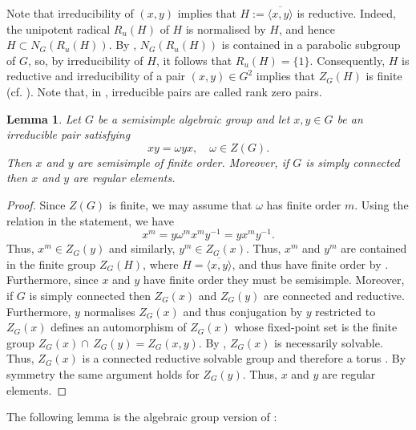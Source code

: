 \documentclass[12pt, a4paper, oneside]{amsart}
\theoremstyle{plain} %
\newtheorem{lemma}[theorem]{Lemma}
\theoremstyle{definition} %
\theoremstyle{remark} %
\begin{document}
Note that irreducibility of $(x,y)$ implies that $H:= \overline{\langle x,y\rangle}$ is reductive. Indeed, the unipotent radical $R_u(H)$ of $H$ is normalised by $H$, and hence $H\subset N_G(R_u(H))$. By \cite[Cor 30.3]{Hum75}, $N_G(R_u(H))$ is contained in a parabolic subgroup of $G$, so, by irreducibility of $H$, it follows that $R_u(H)=\{1\}$. Consequently, $H$ is reductive and irreducibility of a pair $(x,y)\in G^2$ implies that $Z_G(H)$ is finite (cf. \cite[Lemma 7.6]{RY00}). Note that, in \cite{BFM02}, irreducible pairs are called rank zero pairs.

\begin{lemma}
Let $G$ be a semisimple algebraic group and let $x,y\in G$ be an irreducible pair satisfying 
\[xy=\omega yx,\quad \omega\in Z(G).\]
Then $x$ and $y$ are semisimple of finite order. Moreover, if $G$ is simply connected then $x$ and $y$ are regular elements.
\end{lemma}
\begin{proof}
Since $Z(G)$ is finite, we may assume that $\omega$ has finite order $m$. Using the relation in the statement, we have
\[x^m =  y\omega^mx^my^{-1} =yx^my^{-1}.  \]
Thus, $x^m\in Z_G(y)$ and similarly, $y^m\in Z_G(x)$. Thus, $x^m$ and $y^m$ are contained in the finite group $ Z_G(H)$, where $H=\overline{\langle x,y\rangle}$, and thus have finite order by \cite[Lemma 7.6]{RY00}. Furthermore, since $x$ and $y$ have finite order they must be semisimple. Moreover, if $G$ is simply connected then $Z_G(x)$ and $Z_G(y)$ are connected \cite[Theorem 2.11]{Hum95} and reductive. Furthermore, $y$ normalises $Z_G(x)$ and thus conjugation by $y$ restricted to $Z_G(x)$ defines an automorphism of $Z_G(x)$ whose fixed-point set is the finite group $Z_G(x)\cap\, Z_G(y) = Z_G(x,y)$.  By \cite[Corollary 10.10]{Ste68}, $Z_G(x)$ is necessarily solvable. Thus, $Z_G(x)$ is a connected reductive solvable group and therefore a torus \cite[Theorem 19.3 (b)]{Hum75}. By symmetry the same argument holds for $Z_G(y)$. Thus, $x$ and $y$ are regular elements.
\end{proof}

The following lemma is the algebraic group version of \cite[Proposition 4.1.1]{BFM02}:
\end{document}

